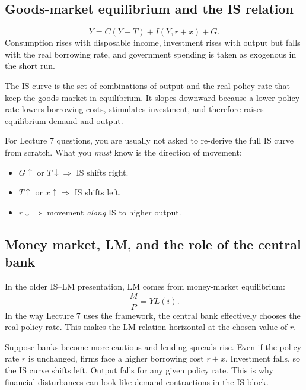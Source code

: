\documentclass[12pt]{article}
\begin{document}
\subsection{Goods-market equilibrium and the IS relation}

\begin{keyformula}
\[
Y = C(Y-T)+I(Y,r+x)+G.
\]
Consumption rises with disposable income, investment rises with output but falls with the real borrowing rate, and government spending is taken as exogenous in the short run.
\end{keyformula}

The IS curve is the set of combinations of output and the real policy rate that keep the goods market in equilibrium. It slopes downward because a lower policy rate lowers borrowing costs, stimulates investment, and therefore raises equilibrium demand and output.

\begin{examtip}[title={Exam Focus: Background assumed from IS--LM}]
For Lecture 7 questions, you are usually not asked to re-derive the full IS curve from scratch. What you \emph{must} know is the direction of movement:
\begin{itemize}[leftmargin=1.5em]
\item $G \uparrow$ or $T \downarrow \Rightarrow$ IS shifts right.
\item $T \uparrow$ or $x \uparrow \Rightarrow$ IS shifts left.
\item $r \downarrow \Rightarrow$ movement \emph{along} IS to higher output.
\end{itemize}
\end{examtip}

\subsection{Money market, LM, and the role of the central bank}

In the older IS--LM presentation, LM comes from money-market equilibrium:
\[
\frac{M}{P}=YL(i).
\]
In the way Lecture 7 uses the framework, the central bank effectively chooses the real policy rate. This makes the LM relation horizontal at the chosen value of $r$.

\begin{examplebox}[title={Worked Example: Why a higher risk premium is contractionary}]
Suppose banks become more cautious and lending spreads rise. Even if the policy rate $r$ is unchanged, firms face a higher borrowing cost $r+x$. Investment falls, so the IS curve shifts left. Output falls for any given policy rate. This is why financial disturbances can look like demand contractions in the IS block.
\end{examplebox}
\end{document}
